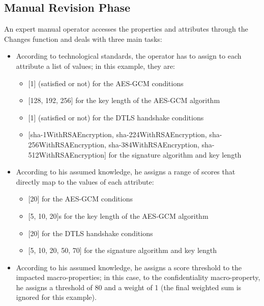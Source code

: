 \subsection{Manual Revision Phase}
An expert manual operator accesses the properties and attributes through the Changes function and deals with three main tasks:
\begin{itemize}
    \item According to technological standards, the operator has to assign to each attribute a list of values; in this example, they are:
    \begin{itemize}
        \item {[1]} (satisfied or not) for the AES-GCM conditions
        \item {[128, 192, 256]} for the key length of the AES-GCM algorithm
        \item {[1]} (satisfied or not) for the DTLS handshake conditions
        \item {[sha-1WithRSAEncryption, sha-224WithRSAEncryption, sha-256WithRSAEncryption, sha-384WithRSAEncryption, sha-512WithRSAEncryption]} for the signature algorithm and key length
    \end{itemize}
    
    \item According to his assumed knowledge, he assigns a range of scores that directly map to the values of each attribute:
    \begin{itemize}
        \item {[20]} for the AES-GCM conditions
        \item {[5, 10, 20]s} for the key length of the AES-GCM algorithm
        \item {[20]} for the DTLS handshake conditions
        \item {[5, 10, 20, 50, 70]} for the signature algorithm and key length
    \end{itemize}
    
    \item According to his assumed knowledge, he assigns a score threshold to the impacted macro-properties; in this case, to the confidentiality macro-property, he assigns a threshold of 80 and a weight of 1 (the final weighted sum is ignored for this example).
\end{itemize}

